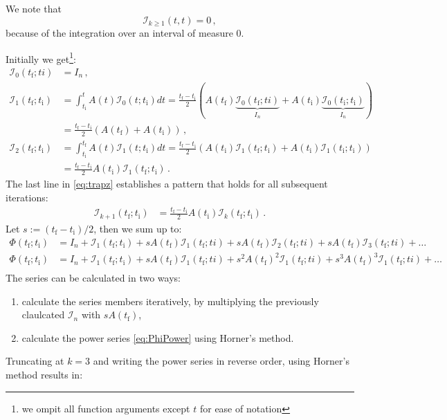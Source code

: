 \documentclass[utf8,english,DIV=12]{scrartcl}
\newcommand{\ti}{\ensuremath{t_{\text{i}}}}
\newcommand{\tf}{\ensuremath{t_{\text{f}}}}
\newcommand{\I}{\ensuremath{\mathcal{I}}}
\newcommand{\eye}[1]{\ensuremath{I_{#1}}}
\begin{document}
We note that
\begin{equation}
  \label{eq:I123}
  \I_{k\ge 1}(t,t)=0\,,
\end{equation}
because of the integration over an interval of measure $0$.

Initially we get\footnote{we ompit all function arguments except $t$ for ease of notation}:
\begin{equation}
  \label{eq:trapz}
  \begin{split}
    \I_0(\tf;ti)&=\eye{n}\,,\\
    \I_1(\tf;\ti)&=\int_{\ti}^{t}A(t) \I_0(t;\ti) dt=\frac{\tf-\ti}{2} \left(A(\tf) \underbrace{\I_0(\tf;ti)}_{\eye{n}} + A(\ti) \underbrace{\I_0(\ti;\ti)}_{\eye{n}}\right)\\
    &=\frac{\tf-\ti}{2} \left(A(\tf) + A(\ti)\right)\,,\\
    \I_2(\tf;\ti) &= \int_{\ti}^{\tf}A(t) \I_1(t;\ti)dt = \frac{\tf-\ti}{2}\left(A(\ti) \I_1(\tf;\ti) + A(\ti) \I_1(\ti;\ti) \right)\\
    &=\frac{\tf-\ti}{2}A(\ti) \I_1(\tf;\ti)\,.
  \end{split}
\end{equation}
The last line in \eqref{eq:trapz} establishes a pattern that holds for all subsequent iterations:
\begin{equation}
  \label{eq:pattern}
  \begin{split}
    \I_{k+1}(\tf;\ti) &= \frac{\tf-\ti}{2}A(\ti) \I_k(\tf;\ti)\,.
  \end{split}
\end{equation}
Let $s:=(\tf-\ti)/2$, then we sum up to:
\begin{align}
  \Phi(\tf;\ti)&=\eye{n} + \I_1(\tf;\ti) + s A(\tf)\I_1(\tf;ti) + s A(\tf)
                 \I_2(\tf;ti) +s A(\tf)\I_3(\tf;ti) + \dots   \label{eq:PhiIteration}\\
    \Phi(\tf;\ti)&=\eye{n} + \I_1(\tf;\ti) + s A(\tf)\I_1(\tf;ti) + s^2 A(\tf)^2 \I_1(\tf;ti) + s^3 A(\tf)^3 \I_1(\tf;ti) +\dots   \label{eq:PhiPower}\\
\end{align}
The series can be calculated in two ways:
\begin{enumerate}
\item calculate the series members iteratively, by multiplying the previously claulcated $\I_n$ with $s A(\tf)$,
\item calculate the power series \eqref{eq:PhiPower} using Horner's method.
\end{enumerate}
Truncating at $k=3$ and writing the power series in reverse order, using Horner's method results in:
\end{document}
